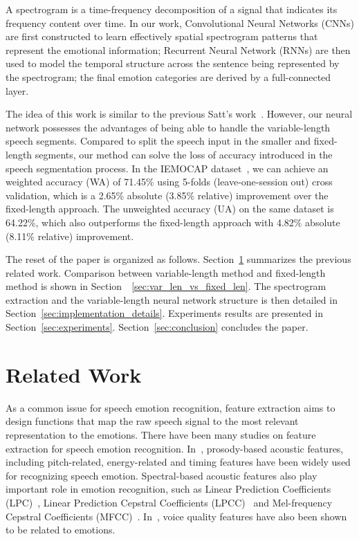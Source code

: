 \documentclass[a4paper]{article}
\begin{document}
A spectrogram is a time-frequency decomposition of a signal that indicates its frequency content over time. In our work, Convolutional Neural Networks (CNNs) are first constructed to learn effectively spatial spectrogram patterns that represent the emotional information; Recurrent Neural Network (RNNs) are then used to model the temporal structure across the sentence being represented by the spectrogram; the final emotion categories are derived by a full-connected layer.

The idea of this work is similar to the previous Satt's work~\cite{satt2017}. However, our neural network possesses the advantages of being able to handle the variable-length speech segments. Compared to split the speech input in the smaller and fixed-length segments, our method can solve the loss of accuracy introduced in the speech segmentation process. In the IEMOCAP dataset~\cite{busso2008}, we can achieve an weighted accuracy (WA) of 71.45\% using 5-folds (leave-one-session out) cross validation, which is a 2.65\% absolute (3.85\% relative) improvement over the fixed-length approach. The unweighted accuracy (UA) on the same dataset is 64.22\%, which also outperforms the fixed-length approach with 4.82\% absolute (8.11\% relative) improvement.

The reset of the paper is organized as follows. Section~\ref{sec:related_work} summarizes the previous related work. Comparison between variable-length method and fixed-length method is shown in Section~~\ref{sec:var_len_vs_fixed_len}. The spectrogram extraction and the variable-length neural network structure is then detailed in Section~\ref{sec:implementation_details}. Experiments results are presented in Section~\ref{sec:experiments}. Section~\ref{sec:conclusion} concludes the paper.

\section{Related Work}
\label{sec:related_work}

As a common issue for speech emotion recognition, feature extraction aims to design functions that map the raw speech signal to the most relevant representation to the emotions. There have been many studies on feature extraction for speech emotion recognition. In~\cite{ma2017, busso2009, cowie2001, vayrynen2013}, prosody-based acoustic features, including pitch-related, energy-related and timing features have been widely used for recognizing speech emotion. Spectral-based acoustic features also play important role in emotion recognition, such as Linear Prediction Coefficients (LPC)~\cite{bellanger1978}, Linear Prediction Cepstral Coefficients (LPCC)~\cite{atal1974} and Mel-frequency Cepstral Coefficients (MFCC)~\cite{davis1980}. In~\cite{gobl2003}, voice quality features have also been shown to be related to emotions.
\end{document}
